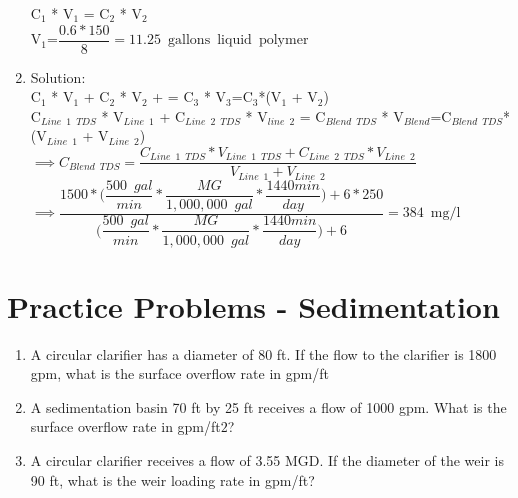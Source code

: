 \begin{enumerate}
\vspace{0.2cm}
C$_1$ * V$_1$ = C$_2$ * V$_2$ \\
\vspace{0.2cm}
V$_{1}$=$\dfrac{0.6*150}{8}=\boxed{11.25 \enspace \mathrm{gallons \enspace liquid \enspace polymer}} $\\
\vspace{0.3cm}


\item Solution:\\
\vspace{0.2cm}
C$_1$ * V$_1$ + C$_2$ * V$_2$ + =  C$_3$ * V$_3$=C$_3$*(V$_1$ + V$_2$)\\
\vspace{0.2cm}
C$_{Line \enspace 1 \enspace TDS} $ * V$_{Line \enspace 1}$ + C$_{Line \enspace 2 \enspace TDS}$ * V$_{line \enspace 2}$ =  C$_{Blend \enspace TDS}$ * V$_{Blend}$=C$_{Blend \enspace TDS}$*(V$_{Line \enspace1}$ + V$_{Line \enspace 2}$)\\
\vspace{0.3cm}
$\implies C_{Blend \enspace TDS}=\dfrac{C_{Line \enspace 1 \enspace TDS} * V_{Line \enspace 1 \enspace TDS} + C_{Line \enspace 2 \enspace TDS} * V_{Line \enspace 2}}{V_{Line \enspace 1} + V_{Line \enspace 2}}$\\
\vspace{0.3cm}
$\implies \dfrac{1500*\Big(\dfrac{500 \enspace gal}{min}*\dfrac{MG}{1,000,000 \enspace gal}*\dfrac{1440 min}{day}\Big)+6*250}{\Big(\dfrac{500 \enspace gal}{min}*\dfrac{MG}{1,000,000 \enspace gal}*\dfrac{1440 min}{day}\Big)+6}=\boxed{384 \enspace \textrm{mg/l}}$

\end{enumerate}

\section*{Practice Problems - Sedimentation}
\begin{enumerate}

\item A circular clarifier has a diameter of 80 ft. If the flow to the clarifier is 1800 gpm, what is the surface overflow rate in gpm/ft

\item A sedimentation basin 70 ft by 25 ft receives a flow of 1000 gpm. What is the surface overflow rate in gpm/ft$2$?


\item A circular clarifier receives a flow of 3.55 MGD. If the diameter of the weir is 90 ft, what is the weir loading rate in gpm/ft?
\end{enumerate}

